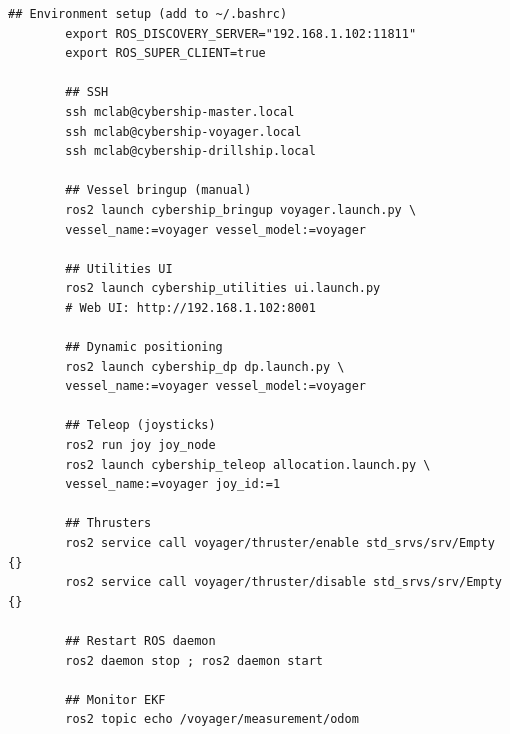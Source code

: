 \documentclass[12pt,a4paper]{article}
\begin{document}
	\begin{lstlisting}[style=bash]
		## Environment setup (add to ~/.bashrc)
		export ROS_DISCOVERY_SERVER="192.168.1.102:11811"
		export ROS_SUPER_CLIENT=true
		
		## SSH
		ssh mclab@cybership-master.local
		ssh mclab@cybership-voyager.local
		ssh mclab@cybership-drillship.local
		
		## Vessel bringup (manual)
		ros2 launch cybership_bringup voyager.launch.py \
		vessel_name:=voyager vessel_model:=voyager
		
		## Utilities UI
		ros2 launch cybership_utilities ui.launch.py
		# Web UI: http://192.168.1.102:8001
		
		## Dynamic positioning
		ros2 launch cybership_dp dp.launch.py \
		vessel_name:=voyager vessel_model:=voyager
		
		## Teleop (joysticks)
		ros2 run joy joy_node
		ros2 launch cybership_teleop allocation.launch.py \
		vessel_name:=voyager joy_id:=1
		
		## Thrusters
		ros2 service call voyager/thruster/enable std_srvs/srv/Empty {}
		ros2 service call voyager/thruster/disable std_srvs/srv/Empty {}
		
		## Restart ROS daemon
		ros2 daemon stop ; ros2 daemon start
		
		## Monitor EKF
		ros2 topic echo /voyager/measurement/odom
	\end{lstlisting}
	
\end{document}
